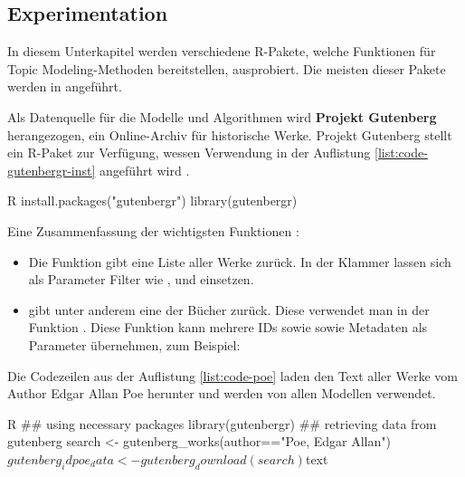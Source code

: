 \subsection{Experimentation}

In diesem Unterkapitel werden verschiedene R-Pakete, welche Funktionen für Topic Modeling-Methoden bereitstellen, ausprobiert. Die meisten dieser Pakete werden in \cite{Wiedemann2022-tm-R} angeführt.

Als Datenquelle für die Modelle und Algorithmen wird \textbf{Projekt Gutenberg} herangezogen, ein Online-Archiv für historische Werke. Projekt Gutenberg stellt ein R-Paket zur Verfügung, wessen Verwendung in der Auflistung \ref{list:code-gutenbergr-inst} angeführt wird \cite{gutenbergr}.

\begin{listing}
    \begin{code}{R}
        install.packages("gutenbergr")
        library(gutenbergr)
    \end{code}
    \caption{Installation und Verwendung vom R-Paket "gutenbergr"}
    \label{list:code-gutenbergr-inst}
\end{listing}

Eine Zusammenfassung der wichtigsten Funktionen \cite{gutenbergr}:
\begin{itemize}
    \item Die Funktion  gibt eine Liste aller Werke zurück. In der Klammer lassen sich als Parameter Filter wie ,  und  einsetzen.
    \item {} gibt unter anderem eine  der Bücher zurück. Diese verwendet man in der Funktion . Diese Funktion kann mehrere IDs sowie sowie Metadaten als Parameter übernehmen, zum Beispiel:
    \\
\end{itemize}

Die Codezeilen aus der Auflistung \ref{list:code-poe} laden den Text aller Werke vom Author Edgar Allan Poe herunter und werden von allen Modellen verwendet.

\begin{listing}
    \begin{code}{R}
        ## using necessary packages
        library(gutenbergr)
        ## retrieving data from gutenberg
        search <- gutenberg_works(author=="Poe, Edgar Allan")$gutenberg_id
        poe_data <- gutenberg_download(search)$text
    \end{code}
    \caption{Codezeilen zum Download aller Werke von E.A. Poe}
    \label{list:code-poe}
\end{listing}


